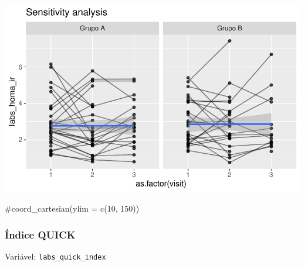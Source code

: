 \documentclass[
  letterpaper,
  DIV=11,
  numbers=noendperiod]{scrartcl}
\newenvironment{Shaded}{\begin{snugshade}}{\end{snugshade}}
\newcommand{\CommentTok}[1]{\textcolor[rgb]{0.37,0.37,0.37}{#1}}
\begin{document}
\includegraphics{Outcomes_V1V2V3_files/figure-pdf/labs_homa_ir_6-2.pdf}

\begin{Shaded}
\begin{Highlighting}[]
    \CommentTok{\#coord\_cartesian(ylim = c(10, 150))}
\end{Highlighting}
\end{Shaded}

\subsubsection{Índice QUICK}\label{uxedndice-quick}

Variável: \texttt{labs\_quick\_index}
\end{document}
